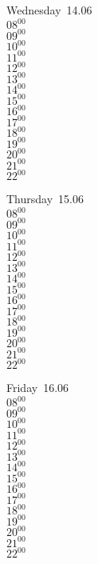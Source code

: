 \documentclass[11pt,a4paper]{book}\usepackage[]{graphicx}\usepackage[]{color}
\begin{document}
\begin{weekdaybox}
  Wednesday~14.06\\
  { 
  \vfill
  $08^{00}$\\
$09^{00}$\\
$10^{00}$\\
$11^{00}$\\
$12^{00}$\\
$13^{00}$\\
$14^{00}$\\
$15^{00}$\\
$16^{00}$\\
$17^{00}$\\
$18^{00}$\\
$19^{00}$\\
$20^{00}$\\
$21^{00}$\\
$22^{00}$\\
  }
\end{weekdaybox}
\clearpage
\begin{headerbox}
\end{headerbox}
\begin{weekdaybox}
  Thursday~15.06\\
  { 
  \vfill
  $08^{00}$\\
$09^{00}$\\
$10^{00}$\\
$11^{00}$\\
$12^{00}$\\
$13^{00}$\\
$14^{00}$\\
$15^{00}$\\
$16^{00}$\\
$17^{00}$\\
$18^{00}$\\
$19^{00}$\\
$20^{00}$\\
$21^{00}$\\
$22^{00}$\\
  }
\end{weekdaybox} 
\begin{weekdaybox}
  Friday~16.06\\
  { 
  \vfill
  $08^{00}$\\
$09^{00}$\\
$10^{00}$\\
$11^{00}$\\
$12^{00}$\\
$13^{00}$\\
$14^{00}$\\
$15^{00}$\\
$16^{00}$\\
$17^{00}$\\
$18^{00}$\\
$19^{00}$\\
$20^{00}$\\
$21^{00}$\\
$22^{00}$\\
  }
\end{weekdaybox}
\end{document}
